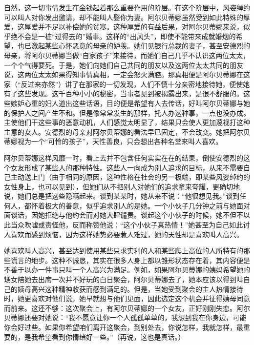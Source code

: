 \par 自然，这一切事情发生在金钱起着那么重要作用的阶层。在这个阶层中，风姿绰约可以叫人对你发出邀请，却不能叫人娶你为妻。阿尔贝蒂娜虽然受到如此特殊的厚爱，这厚爱并不足以补偿她的贫寒。这种厚爱的有益后果，对阿尔贝蒂娜来说，似乎绝不会是一桩“过得去的”婚事。这样的“出风头”，即使不能带来成就婚烟的希望，也已激起某些心怀恶意的母亲的妒羡。她们见银行总裁的妻子，甚至安德烈的母亲，将阿尔贝蒂娜当做“自家孩子”来接待，而她们自己几乎不认识这两位太太，一个个气得要死。于是，她们向她们自己共同的朋友以及这两位太太共同的朋友说，这两位太太如果得知事情真相，一定会怒火满腔。那真相便是阿尔贝蒂娜在这家（“反过来亦然”）讲了在那家的一切发现，人们不慎十分亲密地接待她，便使她有了这些发现。这千百种小小的秘密，当事者见到被揭露出来，是很不舒服的。这些嫉妒心重的妇人道出这些话语，目的便是希望有人去传话，好叫阿尔贝蒂娜与她的保护人之间产生不和。但是像常常发生的那样，托人办这种事，一点也没办成。主使他们干这些事的恶意动机，人们感觉太明显了，结果只会使人更加蔑视打这种主意的女人。安德烈的母亲对阿尔贝蒂娜的看法早已固定，不会改变。她把阿尔贝蒂娜视为一个“可怜的孩子”，天性善良，只会想出各种名堂来叫人喜欢。
\par 阿尔贝蒂娜这样风靡一时，看上去并不包含任何实实在在的结果，倒使安德烈的这个女友形成了某些人的那种特性。这些人一向成为别人追求的目标，从来不需要自己主动送上门（由于相同的原因，这种性格在社会的另一极端，即某些风姿绰约的女性身上，也可以见到），但她们从不把别人对她们的追求拿来夸耀，更确切地说，她们总是把这些隐瞒起来。谈到某某时，她从来不说：“他很想见我。”谈到任何人，都怀着极大的善意，似乎追求别人的是她。一个小伙子几分钟之前与她面对面谈话，因她拒绝与他约会而对她大肆谴责。谈起这个小伙子的时候，她不但不以此当众吹嘘或责怪他，反而称赞他说：“这个小伙子真热情！”她甚至为自己如此讨人喜欢而感到烦恼，因为这样她势必要惹人难过，她的天性却是喜欢叫人高兴。
\par 她喜欢叫人高兴，甚至达到使用某些只求实利的人和某些爬上高位的人所特有的那些谎言的地步。这种不诚恳，其实在很多人身上都以雏形状态存在着，其内容便是不善于以办一件事只叫一个人高兴为满足。例如，如果阿尔贝蒂娜的姨妈希望她的甥女陪她去出席一次并不好玩的白日聚会，阿尔贝蒂娜去了，她本应该以得到叫自己的姨母高兴这种精神收获而感到满足的。但是，当她受到聚会的主人热情接待时，她更喜欢对他们说，她早就想与他们见面，因此选定这个机会并征得姨母同意而前来。这还不够：这次聚会上，有阿尔贝蒂娜的一个女友，正好刚刚失恋。阿尔贝蒂娜还要对她说：“我不愿意让你一个人孤孤单单的，我想到我在你身边，可能你会好过些。如果你希望咱们离开这聚会，到别处去，你说怎样，我就怎样，最重要的，是我希望看到你情绪好一些。”（再说，这也是真话。）
